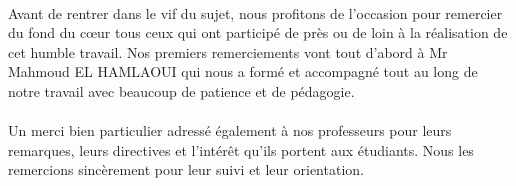 \documentclass{article}
\begin{document}
\thispagestyle{firstpage}
\onehalfspacing\paragraph{}{Avant de rentrer dans le vif du sujet, nous profitons de l’occasion pour remercier du fond du cœur tous ceux qui ont participé de près ou de loin à la réalisation de cet humble travail. Nos premiers remerciements vont tout d’abord à Mr Mahmoud EL HAMLAOUI qui nous a formé et accompagné tout au long de notre travail avec beaucoup de patience et de pédagogie.

\onehalfspacing\paragraph{}{
Un merci bien particulier adressé également à nos professeurs pour leurs remarques, leurs directives et
l'intérêt qu'ils portent aux étudiants. Nous les remercions sincèrement pour leur suivi et leur orientation.}

\newpage
\tableofcontents
\newpage
\listoffigures

\newpage
\begin{center}

\end{center}}
\end{document}
